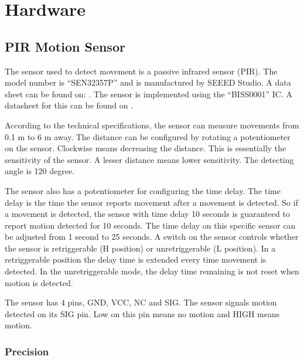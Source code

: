 \section{Hardware}

\subsection{PIR Motion Sensor}

The sensor used to detect movement is a passive infrared sensor (PIR). The model
number is \enquote{SEN32357P} and is manufactured by SEEED Studio. A data sheet
can be found on:
\cite{datasheet_pir1}. The
sensor is implemented using the \enquote{BISS0001} IC. A datasheet for this can
be found on \cite{datasheet_pir2}.

According to the technical specifications, the sensor can measure movements from 0.1 m to 6
m away. The distance can be configured by rotating a potentiometer on the
sensor. Clockwise means decreasing the distance. This is essentially the
sensitivity of the sensor. A lesser distance means lower sensitivity. The detecting angle is 120 degree.

The sensor also has a potentiometer for configuring the time delay. The time
delay is the time the sensor reports movement after a movement is detected. So
if a movement is detected, the sensor with time delay 10 seconds is guaranteed
to report motion detected for 10 seconds. The time delay on this specific sensor
can be adjusted from 1 second to 25 seconds. A switch on the sensor controls
whether the sensor is retriggerable (H position) or unretriggerable (L
position). In a retriggerable position the delay time is extended every time
movement is detected. In the unretriggerable mode, the delay time remaining is
not reset when motion is detected.

The sensor has 4 pins, GND, VCC, NC and SIG. The sensor signals motion detected
on its SIG pin. Low on this pin means no motion and HIGH means motion.

\subsubsection{Precision}